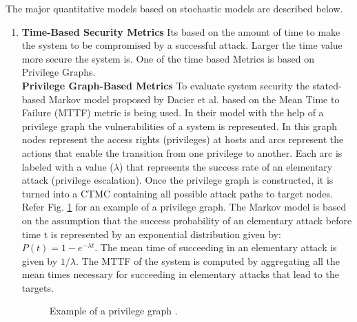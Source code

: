 \documentclass[pdftex,english,oribibl]{llncs}
\begin{document}
The major quantitative models based on stochastic models are described below.
\begin{enumerate}[(1)]
	\item {\textbf{Time-Based Security Metrics}\newline 
	Its based on the amount of time to make the system to be compromised by a successful attack. Larger the time value more secure the system is. One of the time based Metrics is based on Privilege Graphs.\\
    \textbf{Privilege Graph-Based Metrics}\newline 
	To evaluate system security the stated-based Markov model proposed by Dacier et al. \cite{Dacier1996QuantitativeAO} based on the Mean Time to Failure (MTTF) metric is being used. In their model with the help of a privilege graph the vulnerabilities of a system is represented. In this graph nodes represent the access rights (privileges) at hosts and arcs represent the actions that enable the transition from one privilege to another. Each arc is labeled with a value ($\lambda$) that represents the success rate of an elementary attack (privilege escalation). Once the privilege graph is constructed, it is turned into a CTMC containing all possible attack paths to target nodes. Refer Fig. \ref{fig:privilege_graph_example} for an example of a privilege graph.  The Markov model is based on the assumption that the success probability of an elementary attack before time t is represented by an exponential distribution given by: $P(t) = 1 - e^{-\lambda t}$. The mean time of succeeding in an elementary attack is given by $1/\lambda$. The MTTF of the system is computed by aggregating all the mean times necessary for succeeding in elementary attacks that lead to the targets.\\
		
	\begin{figure}[h]
		\centering
		\caption{Example of a privilege graph \cite{Ortalo97informationsystems}.}
		\label{fig:privilege_graph_example}
	\end{figure}
		
}
\end{enumerate}
\end{document}

